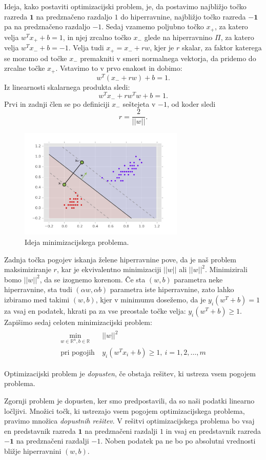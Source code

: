 \documentclass[mat1]{fmfdelo}
\newcommand{\R}{\mathbb R}
\newcommand{\pr}{\mathbf 1}
\newcommand{\nr}{\mathbf {-1}}
\begin{document}
Ideja, kako postaviti optimizacijski problem, je, da postavimo najbližjo točko razreda $\pr$ na predznačeno razdaljo $1$ do hiperravnine, najbližjo točko razreda $\nr$ pa na predznačeno razdaljo $-1$. Sedaj vzamemo poljubno točko $x_+$, za katero velja  $w^Tx_++ b = 1 $, in njej zrcalno točko $x_-$ glede na hiperravnino $\Pi$, za katero velja $w^Tx_-+ b = -1 $. Velja tudi $x_+ = x_- + r w$, kjer je $r$ skalar, za faktor katerega se moramo od točke $x_-$ premakniti v smeri normalnega vektorja, da pridemo do zrcalne točke $x_+$. Vstavimo to v prvo enakost in dobimo:
$$ w^T( x_- + r w)  + b = 1. $$
Iz linearnosti skalarnega produkta sledi: 
$$ w^Tx_-  + rw^Tw+ b = 1. $$
Prvi in zadnji člen se po definiciji $x_-$ seštejeta v $-1$, od koder sledi 
$$ r = \frac{2}{||w||}.$$
\begin{figure}[H]
	\centering
	\includegraphics[width=0.7\textwidth]{slike/LinearnoLocljiviOptimizacija.jpg}
	\caption{Ideja minimizacijskega problema.}
	\label{slikaIdejaMinimizacijskegaProblema}
\end{figure}
Zadnja točka pogojev iskanja želene hiperravnine pove, da je naš problem maksimiziranje $r$, kar je ekvivalentno minimizaciji $||w||$ ali $||w||^2.$ Minimizirali bomo $||w||^2$, da se izognemo korenom. 
Če sta $(w, b)$ parametra neke hiperravnine, sta tudi $(\alpha w, \alpha b)$ parametra iste hiperravnine, zato lahko izbiramo med takimi $(w, b)$, kjer v minimumu dosežemo, da je $y_i(w^T+b) =1$ za vsaj en podatek, hkrati pa za vse preostale točke velja: $y_i(w^T+b) \ge 1.$
Zapišimo sedaj celoten minimizacijski problem: 
\begin{align}
\label{min_prvic}
\begin{split}
\min_{w \in \R^n, b \in \R}  &||w||^2  \\
\text{pri pogojih}~ &y_i(w^Tx_i + b)\ge 1,  ~ i= 1, 2, \ldots, m
\end{split}
\end{align}
\begin{definicija}
	Optimizacijski problem je \emph{dopusten}, če obstaja rešitev, ki ustreza vsem pogojem problema. 
\end{definicija}
Zgornji problem je dopusten, ker smo predpostavili, da so naši podatki linearno ločljivi. Množici točk, ki ustrezajo vsem pogojem optimizacijskega problema, pravimo množica \emph{dopustnih rešitev}. 
V rešitvi optimizacijskega problema bo vsaj en predstavnik razreda $\pr$ na predznačeni razdalji $1$ in vsaj en predstavnik razreda $\nr$ na predznačeni razdalji $-1$. Noben podatek pa ne bo po absolutni vrednosti bližje hiperravnini $(w, b)$.
\end{document}
